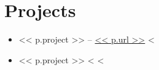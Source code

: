 \section{Projects}

\vskip 2pt
\begin{itemize}[style=sameline,
                    itemsep=1pt,
                    parsep=0pt,
                    topsep=0pt,
                    partopsep=0pt,
                    labelindent=2cm,
                    rightmargin=5mm]
    <%
    <%
    \item << p.project >> -- \url{<< p.url >>}
    <%
    \item << p.project >>
    <%
    <%
\end{itemize}

